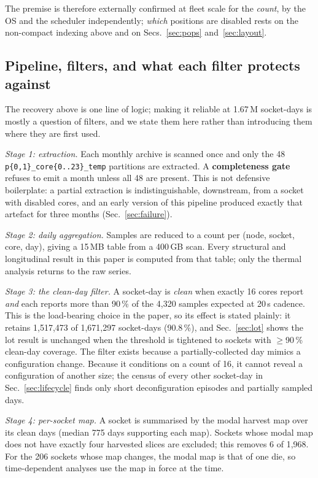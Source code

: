 \documentclass[10pt,conference]{IEEEtran}
\begin{document}
The premise is therefore externally confirmed at fleet scale for the \emph{count}, by the OS and the
scheduler independently; \emph{which} positions are disabled rests on the non-compact indexing above
and on Secs.~\ref{sec:pops} and~\ref{sec:layout}.

\subsection{Pipeline, filters, and what each filter protects against}
\label{sec:pipeline}
The recovery above is one line of logic; making it reliable at 1.67\,M socket-days is mostly a
question of filters, and we state them here rather than introducing them where they are first used.

\emph{Stage 1: extraction.} Each monthly archive is scanned once and only the 48
\texttt{p\{0,1\}\_core\{0..23\}\_temp} partitions are extracted. A \textbf{completeness gate}
refuses to emit a month unless all 48 are present. This is not defensive boilerplate: a partial
extraction is indistinguishable, downstream, from a socket with disabled cores, and an early
version of this pipeline produced exactly that artefact for three months (Sec.~\ref{sec:failure}).

\emph{Stage 2: daily aggregation.} Samples are reduced to a count per (node, socket, core,
day), giving a 15\,MB table from a 400\,GB scan. Every structural and longitudinal result in this
paper is computed from that table; only the thermal analysis returns to the raw series.

\emph{Stage 3: the clean-day filter.} A socket-day is \emph{clean} when exactly 16 cores report
\emph{and} each reports more than 90\,\% of the 4{,}320 samples expected at 20\,s cadence. This
is the load-bearing choice in the paper, so its effect is stated plainly: it retains
1{,}517{,}473 of 1{,}671{,}297 socket-days (90.8\,\%), and Sec.~\ref{sec:lot} shows the lot
result is unchanged when the threshold is tightened to sockets with $\ge$90\,\% clean-day
coverage. The filter exists because a partially-collected day mimics a configuration change.
Because it conditions on a count of 16, it cannot reveal a configuration of another size; the
census of every other socket-day in Sec.~\ref{sec:lifecycle} finds only short deconfiguration
episodes and partially sampled days.

\emph{Stage 4: per-socket map.} A socket is summarised by the modal harvest map over its clean
days (median 775 days supporting each map). Sockets whose modal map does not have exactly four
harvested slices are excluded; this removes 6 of 1{,}968. For the 206 sockets whose map changes,
the modal map is that of one die, so time-dependent analyses use the map in force at the time.
\end{document}
